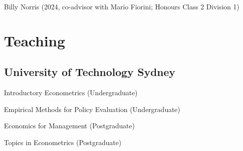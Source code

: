 \documentclass[10pt,letterpaper]{article}
\renewenvironment{itemize}{
  \begin{list}{}{
      \setlength{\leftmargin}{1.5em}
      \setlength{\itemsep}{0.25em}
      \setlength{\parskip}{0pt}
      \setlength{\parsep}{0.25em}
    }
}{
  \end{list}
}
\begin{document}
\begin{itemize}
\item Billy Norris (2024, co-advisor with Mario Fiorini; Honours Class 2 Division 1)
\end{itemize}

\section*{Teaching}

%

\subsection*{University of Technology Sydney}

\begin{itemize}
\item Introductory Econometrics (Undergraduate)
\item Empirical Methods for Policy Evaluation (Undergraduate)
\item Economics for Management (Postgraduate)
\item Topics in Econometrics (Postgraduate)
\end{itemize}
\end{document}
